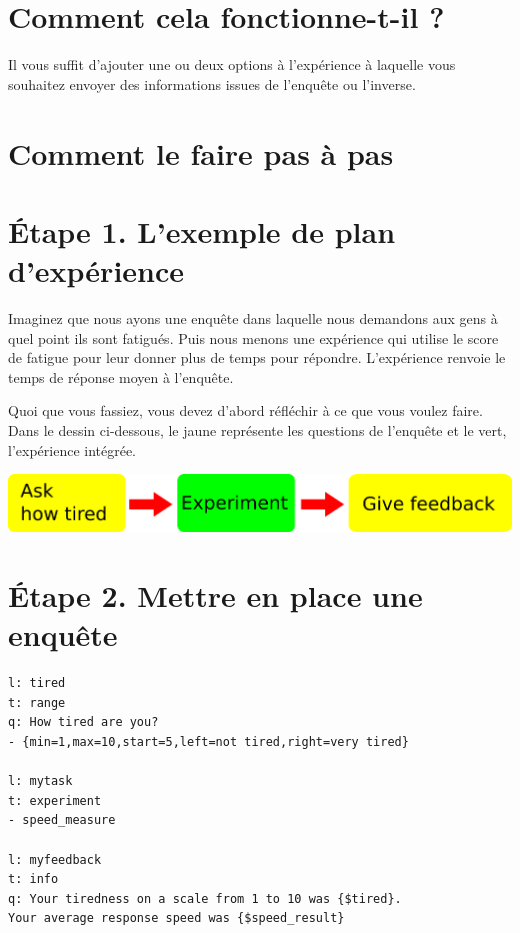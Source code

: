 \documentclass[
]{book}
\begin{document}
\hypertarget{comment-cela-fonctionne-t-il}{%
\section{Comment cela fonctionne-t-il
?}\label{comment-cela-fonctionne-t-il}}

Il vous suffit d'ajouter une ou deux options à l'expérience à laquelle
vous souhaitez envoyer des informations issues de l'enquête ou
l'inverse.

\hypertarget{comment-le-faire-pas-uxe0-pas}{%
\section{Comment le faire pas à
pas}\label{comment-le-faire-pas-uxe0-pas}}

\hypertarget{uxe9tape-1.-lexemple-de-plan-dexpuxe9rience}{%
\section{Étape 1. L'exemple de plan
d'expérience}\label{uxe9tape-1.-lexemple-de-plan-dexpuxe9rience}}

Imaginez que nous ayons une enquête dans laquelle nous demandons aux
gens à quel point ils sont fatigués. Puis nous menons une expérience qui
utilise le score de fatigue pour leur donner plus de temps pour
répondre. L'expérience renvoie le temps de réponse moyen à l'enquête.

Quoi que vous fassiez, vous devez d'abord réfléchir à ce que vous voulez
faire. Dans le dessin ci-dessous, le jaune représente les questions de
l'enquête et le vert, l'expérience intégrée.

\includegraphics{img/design_var_in_out.png}

\hypertarget{uxe9tape-2.-mettre-en-place-une-enquuxeate}{%
\section{Étape 2. Mettre en place une
enquête}\label{uxe9tape-2.-mettre-en-place-une-enquuxeate}}

\begin{verbatim}
l: tired
t: range
q: How tired are you?
- {min=1,max=10,start=5,left=not tired,right=very tired}

l: mytask
t: experiment
- speed_measure

l: myfeedback
t: info
q: Your tiredness on a scale from 1 to 10 was {$tired}.
Your average response speed was {$speed_result}
\end{verbatim}
\end{document}
